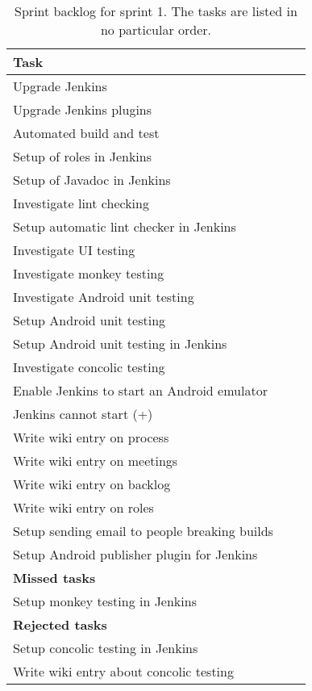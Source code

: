 \begin{table}%
  \centering
  \begin{tabular}{p{}rr}
    \toprule
    \textbf{Task} \\
    \midrule
    Upgrade Jenkins                                   \\
    Upgrade Jenkins plugins                           \\
    Automated build and test                          \\
    Setup of roles in Jenkins                         \\
    Setup of Javadoc in Jenkins                       \\
    Investigate lint checking                         \\
    Setup automatic lint checker in Jenkins           \\
    Investigate UI testing                            \\
    Investigate monkey testing                        \\
    Investigate Android unit testing                  \\
    Setup Android unit testing                        \\
    Setup Android unit testing in Jenkins             \\
    Investigate concolic testing                      \\
    Enable Jenkins to start an Android emulator       \\
    Jenkins cannot start (+)                          \\
    Write wiki entry on process                       \\
    Write wiki entry on meetings                      \\
    Write wiki entry on backlog                       \\
    Write wiki entry on roles                         \\
    Setup sending email to people breaking builds     \\
    Setup Android publisher plugin for Jenkins        \\
    \midrule
    \textbf{Missed tasks} & & \\
    \midrule
    Setup monkey testing in Jenkins                   \\
    \midrule
    \textbf{Rejected tasks} & & \\
    \midrule
    Setup concolic testing in Jenkins                 \\
    Write wiki entry about concolic testing           \\
    \bottomrule
  \end{tabular}
\caption{Sprint backlog for sprint 1. The tasks are listed in no particular order.}
\label{tab:sprint1_tasks}
\end{table}

